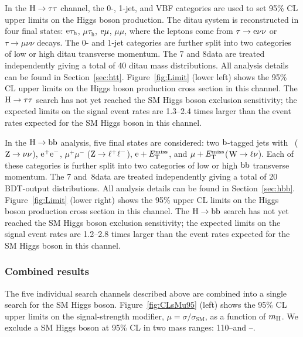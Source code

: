 \documentclass[11pt,twoside,a4paper,cmspaper,final,collab]{cms-tdr}
\begin{document}
In the $\mathrm{H} \to \tau\tau$ channel, the 0-, 1-jet, and VBF
categories are used to set 95\% CL upper limits
on the Higgs boson production. The ditau system is reconstructed in four final states:
$\mathrm{e}\tau_{\mathrm{h}}$, $\mu\tau_{\mathrm{h}}$, $\mathrm{e}\mu$, $\mu\mu$, where the leptons come
from $\tau \to \mathrm{e}\nu\nu$ or $\tau \to \mu\nu\nu$
decays.
The 0- and 1-jet categories are further split into two categories of low or
high ditau transverse momentum.
The 7 and 8\TeV data are treated independently giving a total of
40 ditau mass distributions.
All analysis details can be found in Section~\ref{sec:htt}.
Figure~\ref{fig:Limit} (lower left) shows the 95\% CL upper limits
on the Higgs boson production cross section in this channel.
The $\mathrm{H} \to \tau\tau$ search
has not yet reached the SM Higgs boson exclusion sensitivity;
the expected limits on the signal event rates are
1.3--2.4 times larger than the event rates expected for the SM Higgs boson in this channel.



In the $\mathrm{H} \to \mathrm{b}\mathrm{b}$ analysis, five final states are considered:
two $\mathrm{b}$-tagged jets with \met\ ($\mathrm{Z} \to \nu\nu$), $\mathrm{e}^+\mathrm{e}^-$,
$\mu^+\mu^-$ ($\mathrm{Z} \to \ell^+\ell^-$), $\mathrm{e} + E_{\mathrm{T}}^{\text{miss}}$, and $\mu + E_{\mathrm{T}}^{\text{miss}}$($\mathrm{W} \to \ell\nu$).
Each of these categories is further split into two categories of low or high $\mathrm{b}\mathrm{b}$ transverse momentum.
The 7 and~8\TeV data are treated independently giving a total of
20 BDT-output distributions. All analysis details can be found in Section~\ref{sec:hbb}.
Figure~\ref{fig:Limit} (lower right) shows the 95\% upper CL limits
on the Higgs boson production cross section in this channel.
The $\mathrm{H} \to \mathrm{b}\mathrm{b}$ search
has not yet reached the SM Higgs boson exclusion sensitivity;
the expected limits on the signal event rates are
1.2--2.8 times larger than the event rates expected for the SM Higgs boson in this channel.



\subsubsection{Combined results}


The five individual search channels described above are combined
into a single search for the SM Higgs boson.
Figure~\ref{fig:CLsMu95} (left) shows the 95\% CL upper limits on the signal-strength modifier,
$\mu = \sigma / \sigma_{\mathrm{SM}}$,
as a function of $m_{\mathrm{H}}$.
We exclude a SM Higgs boson at 95\% CL in two mass ranges:
110--\ObsNFL\GeV and \ObsNFH--\MHmax\GeV.
\end{document}
